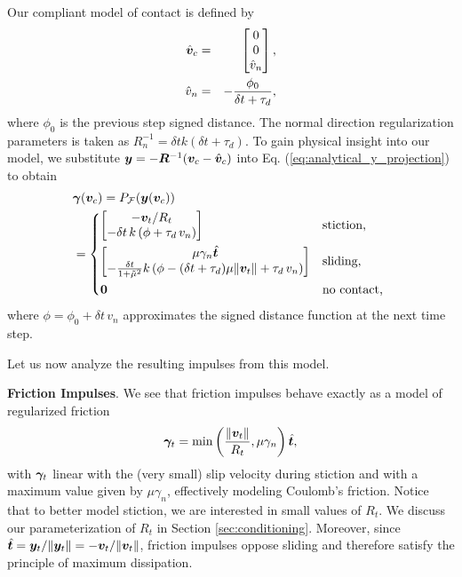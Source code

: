 Our compliant model of contact is defined by
\begin{eqnarray*}
	\hat{{\bm{v}}}_c &=&
	\begin{bmatrix}
		0\\
		0\\
		\hat{v}_n \end{bmatrix}\nonumber,\\
	\hat{v}_n &=& -\frac{\phi_0}{\delta t+\tau_d},
\end{eqnarray*}
where $\phi_0$ is the previous step signed distance. The normal direction
regularization parameters is taken as $R_n^{-1} = \delta t k(\delta t+\tau_d)$.
To gain physical insight into our model, we substitute
${\bm{y}}=-{\bm{R}}^{-1}({\bm{v}}_c - \hat{{\bm{v}}}_c)$ into Eq.
(\ref{eq:analytical_y_projection}) to obtain 
\begin{align*}
	&{\bm\gamma}({\bm{v}}_c) = P_\mathcal{F}({\bm{y}}({\bm{v}}_c))\\
&=\begin{dcases}
	\begin{bmatrix}
		-{\bm{v}}_t/R_t\\
		-\delta t\,k\,(\phi + \tau_d\,v_n)
	\end{bmatrix}
	& \text{stiction, } \\
	\begin{bmatrix}
		\mu\gamma_n\hat{{\bm{t}}}\\
		-\frac{\delta t}{1+\tilde\mu^2}k\left(\phi-(\delta
		t+\tau_d)\mu\Vert{\bm{v}}_t\Vert + \tau_d\,v_n \right)
	\end{bmatrix}
	& \text{sliding, }\\
    {\bm{0}} & \text{no contact, } \end{dcases}\nonumber	
\end{align*}
where $\phi= \phi_0 + \delta t\,v_n$ approximates the signed distance function
at the next time step.

Let us now analyze the resulting impulses from this
model.

\textbf{Friction Impulses}. We see that friction impulses behave exactly as a model
of regularized friction
\begin{equation}
	\bgamma_t = \min\left(\frac{\Vert\vf{v}_t\Vert}{R_t}, \mu\gamma_n\right)\hat{\vf{t}},
	\label{eq:regularized_friction}
\end{equation}
with ${\bm\gamma}_t$ linear with the (very small) slip velocity during stiction and
with a maximum value given by $\mu\gamma_n$, effectively modeling Coulomb's
friction. Notice that to better model stiction, we are interested in small
values of $R_t$. We discuss our parameterization of $R_t$ in Section
\ref{sec:conditioning}. Moreover, since $\hat{{\bm{t}}} =
{\bm{y}}_t/\Vert{\bm{y}}_t\Vert = -{\bm{v}}_t/\Vert{\bm{v}}_t\Vert$, friction impulses
oppose sliding and therefore satisfy the principle of maximum dissipation.

